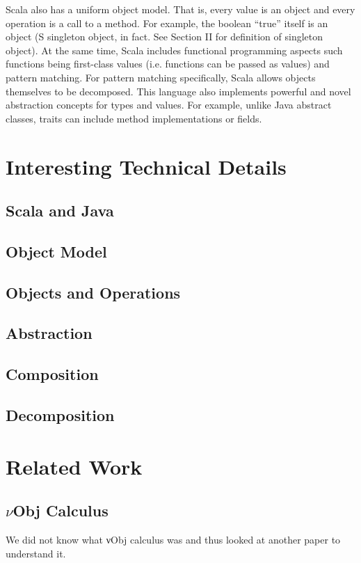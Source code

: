 \documentclass[jou,apacite]{IEEEtran}
\begin{document}
Scala also has a uniform object model. That is, every value is an object and every operation is a call to a method. For example, the boolean “true” itself is an object (S singleton object, in fact. See Section II for definition of singleton object). At the same time, Scala includes functional programming aspects such functions being first-class values (i.e. functions can be passed as values) and pattern matching. For pattern matching specifically, Scala allows objects themselves to be decomposed. This language also implements powerful and novel abstraction concepts for types and values. For example, unlike Java abstract classes, traits can include method implementations or fields.





\section{Interesting Technical Details}
\subsection{Scala and Java}

\subsection{Object Model}

\subsection{Objects and Operations}

\subsection{Abstraction}

\subsection{Composition}

\subsection{Decomposition}

\section{Related Work}
\subsection{$\nu$Obj Calculus}
We did not know what νObj calculus was and thus looked at another paper to understand it.
\end{document}
